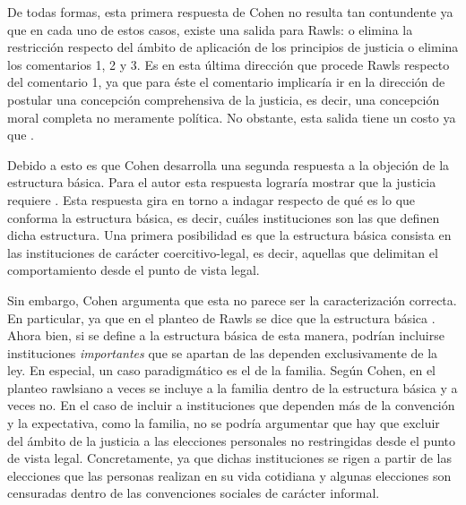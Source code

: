 De todas formas, esta primera respuesta de Cohen no resulta tan contundente ya que en cada uno de estos casos, existe una salida para Rawls: o elimina la restricción respecto del ámbito de aplicación de los principios de justicia o elimina los comentarios 1, 2 y 3. Es en esta última dirección que procede Rawls respecto del comentario 1, ya que para éste el comentario implicaría ir en la dirección de postular una concepción comprehensiva de la justicia, es decir, una concepción moral completa no meramente política. No obstante, esta salida tiene un costo ya que  \citep[p. 183]{Cohen_2001}.

Debido a esto es que Cohen desarrolla una segunda respuesta a la objeción de la estructura básica. Para el autor esta respuesta lograría mostrar que la justicia requiere  \citep[p. 184]{Cohen_2001}. Esta respuesta gira en torno a indagar respecto de qué es lo que conforma la estructura básica, es decir, cuáles instituciones son las que definen dicha estructura. Una primera posibilidad es que la estructura básica consista en las instituciones de carácter coercitivo-legal, es decir, aquellas que delimitan el comportamiento desde el punto de vista legal. 

Sin embargo, Cohen argumenta que esta no parece ser la caracterización correcta. En particular, ya que en el planteo de Rawls se dice que la estructura básica  \citep[p. 185]{Cohen_2001}. Ahora bien, si se define a la estructura básica de esta manera, podrían incluirse instituciones \textit{importantes} que se apartan de las dependen exclusivamente de la ley. En especial, un caso paradigmático es el de la familia. Según Cohen, en el planteo rawlsiano a veces se incluye a la familia dentro de la estructura básica y a veces no. En el caso de incluir a instituciones que dependen más de la convención y la expectativa, como la familia, no se podría argumentar que hay que excluir del ámbito de la justicia a las elecciones personales no restringidas desde el punto de vista legal. Concretamente, ya que dichas instituciones se rigen a partir de las elecciones que las personas realizan en su vida cotidiana y algunas elecciones son censuradas dentro de las convenciones sociales de carácter informal.


